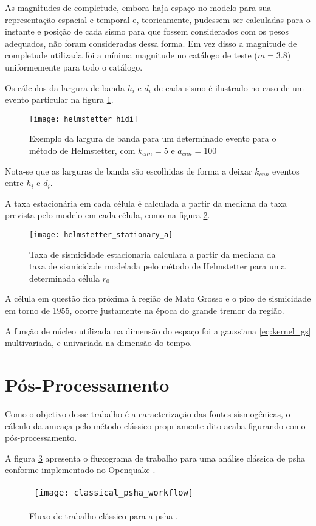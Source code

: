 As magnitudes de completude, embora haja espaço no modelo para sua representação espacial e temporal
e, teoricamente, pudessem ser calculadas para o instante e posição de cada sismo para que fossem
considerados com os pesos adequados, não foram consideradas dessa forma. Em vez disso a magnitude
de completude utilizada foi a mínima magnitude no catálogo de teste ($m=3.8$) uniformemente para todo o catálogo.

Os cálculos da largura de banda $h_i$ e $d_i$ de cada sismo é ilustrado no caso de um evento particular na figura
\ref{fig:h_hidi}.

\begin{figure}[H]
  \centering
  \texttt{[image: helmstetter\_hidi]} 
  \caption{Exemplo da largura de banda para um determinado evento para o método de Helmstetter, com $k_{cnn} = 5$ e
  $a_{cnn} = 100$}
  \label{fig:h_hidi} 
\end{figure}

Nota-se que as larguras de banda são escolhidas de forma a deixar $k_{cnn}$ eventos entre $h_i$ e $d_i$.

A taxa estacionária em cada célula é calculada a partir da mediana da taxa prevista pelo modelo em cada célula,
como na figura \ref{fig:h_stationary}.
\begin{figure}[H]
  \centering
  \texttt{[image: helmstetter\_stationary\_a]} 
  \caption{Taxa de sismicidade estacionaria calculara a partir da mediana da taxa de sismicidade
  modelada pelo método de Helmstetter para uma determinada célula $r_0$}
  \label{fig:h_stationary} 
\end{figure}
A célula em questão fica próxima à região de Mato Grosso e o pico de sismicidade em torno de 1955,
ocorre justamente na época do grande tremor da região.

A função de núcleo utilizada na dimensão do espaço foi a gaussiana \eqref{eq:kernel_gs} multivariada, 
e univariada na dimensão do tempo.

\section{Pós-Processamento}
\label{sec:pos_proc}

Como o objetivo desse trabalho é a caracterização das fontes sísmogênicas,
o cálculo da ameaça pelo método clássico propriamente dito
acaba figurando como pós-processamento.

A figura \ref{fig:classical_psha} apresenta o fluxograma de trabalho para uma análise clássica de \gls{psha} conforme
implementado no Openquake \citep{pagani_2010, weatherill_2012}.

\begin{figure}[H]
	\centering
	\begin{tabular}{l}
	\texttt{[image: classical\_psha\_workflow]}
	\end{tabular}
	\caption{Fluxo de trabalho clássico para a \gls{psha} \citep{crowley_2013}.}
\label{fig:classical_psha}
\end{figure}

